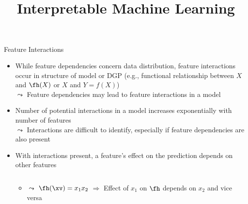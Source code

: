 \documentclass[11pt,compress,t,notes=noshow, aspectratio=169, xcolor=table]{beamer}
\title{Interpretable Machine Learning}
\date{}
\begin{document}
\newcommand{\titlefigure}{figure/open_blackbox}
\newcommand{\learninggoals}{
\item Feature interactions}



\begin{frame}{Feature Interactions}
\begin{itemize}
\item While feature dependencies concern data distribution, feature interactions occur in structure of model or DGP (e.g., functional relationship between $X$ and $\fh(X)$ or $X$ and $Y = f(X)$)\\
$\leadsto$ Feature dependencies may lead to feature interactions in a model
\pause
\item Number of potential interactions in a model increases exponentially with number of features \\
$\leadsto$ Interactions are difficult to identify, especially if feature dependencies are also present
\pause
\item With interactions present, a feature's effect on the prediction depends on other features

\begin{columns}[T, totalwidth=\textwidth]
\begin{column}{0.5\textwidth}
\vspace{-0.2cm}
\begin{itemize}
    \item[] $\leadsto$
$\fh(\xv) = x_1 x_2$ $\Rightarrow$ Effect of $x_1$ on $\fh$ depends on $x_2$ and vice versa 
\end{itemize}
\vspace{0.5cm}
\centering
{}
\end{column}
\end{columns}
\end{itemize}
\end{frame}
\end{document}
